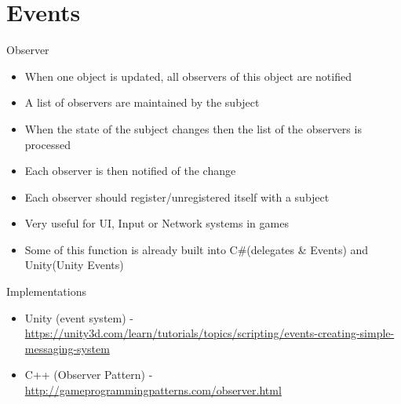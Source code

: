 \part{Events}
\frame{\partpage}

\begin{frame}{Observer}
	\begin{itemize}
		\pause \item When one object is updated, all observers of this object are notified
		\pause \item A list of observers are maintained by the subject
		\pause \item When the state of the subject changes then the list of the observers is processed
		\pause \item Each observer is then notified of the change
		\pause \item Each observer should register/unregistered itself with a subject 
		\pause \item Very useful for UI, Input or Network systems in games
		\pause \item Some of this function is already built into C\#(delegates \& Events) and Unity(Unity Events)
	\end{itemize}
\end{frame}

\begin{frame}{Implementations}
	\begin{itemize}
		\pause \item Unity (event system)  - \url{https://unity3d.com/learn/tutorials/topics/scripting/events-creating-simple-messaging-system}
		\pause \item C++ (Observer Pattern) - \url{http://gameprogrammingpatterns.com/observer.html}
	\end{itemize}
\end{frame}